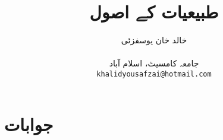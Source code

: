 \documentclass[leqno,b5paper]{book}
\author{
خالد خان یوسفزئی\\
\\
{\small {جامعہ کامسیٹ، اسلام آباد}}\\
\texttt{khalidyousafzai@hotmail.com}
}
\title{
طبیعیات  کے اصول
}
\begin{document}
\sloppy

\renewcommand*{\contentsname}{عنوان}    %


\frontmatter                          %

\maketitle

\tableofcontents
\pagestyle{empty}
\newpage

\newpage

%


\mainmatter                      %

\pagestyle{headings}

%









\chapter*{جوابات}
\immediate\closeout\tempfile
\begin{multicols}{2}
{\small

}
\end{multicols}
\end{document}
